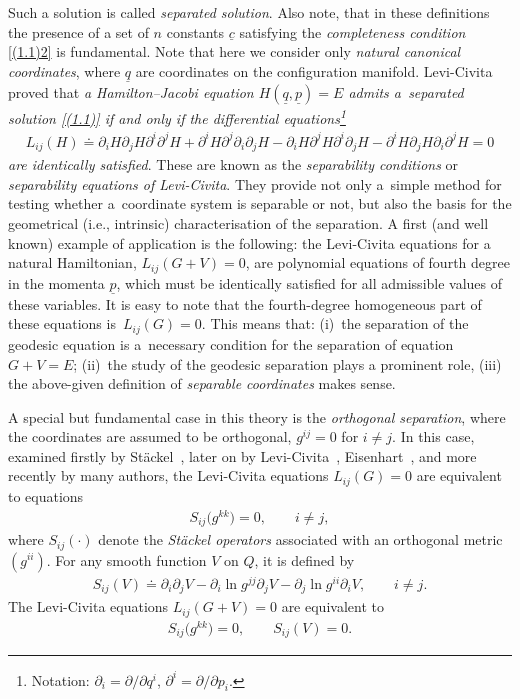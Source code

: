 \documentclass[pdftex]{sigma}
\numberwithin{equation}{section}
\begin{document}
Such a solution is called {\it separated solution}. Also note, that in these def\/initions the presence of a set of $n$ constants $\underline c$ satisfying the {\it completeness condition} \eqref{(1.1)2} is fundamental. Note that here we consider only {\it natural canonical coordinates}, where $\underline q$ are coordinates on the conf\/iguration manifold. Levi-Civita~\cite{LC-1904} proved that {\it a Hamilton--Jacobi equation $H(\underline q,\underline p)=E$ admits a~separated solution \eqref{(1.1)} if and only if the differential equations\footnote{Notation: $\partial_i=\partial/\partial q^i$, $\partial^i=\partial/\partial p_i$.}
\begin{gather*}
L_{ij}(H)\doteq \partial _i H\partial_jH \partial ^i\partial^jH+
\partial^iH \partial ^j \partial _i\partial_jH-
\partial_iH \partial ^jH \partial ^i\partial _jH-
\partial^iH \partial _jH \partial _i\partial ^jH=0
\end{gather*}
are identically satisfied}. These are known as the {\it separability conditions} or {\it separability equations of Levi-Civita}. They provide not only a~simple method for testing whether a~coordinate system is separable or not, but also the basis for the geometrical (i.e., intrinsic) characterisation of the separation. A f\/irst (and well known) example of application is the following: the Levi-Civita equations for a natural Hamiltonian, $L_{ij}(G+V)=0$, are polynomial equations of fourth degree in the momenta $\underline p$, which must be identically satisf\/ied for all admissible values of these variables. It is easy to note that the fourth-degree homogeneous part of these equations is~$L_{ij}(G)=0$. This means that: (i)~the separation of the geodesic equation is a~necessary condition for the separation of equation $G+V=E$; (ii)~the study of the geodesic separation plays a prominent role, (iii) the above-given def\/inition of {\it separable coordinates} makes sense.

A special but fundamental case in this theory is the {\it orthogonal separation}, where the coordinates are assumed to be orthogonal, $g^{ij}=0$ for $i\neq j$. In this case, examined f\/irstly by St\"ackel~\cite{Stackel-1893,Stackel-1897}, later on by Levi-Civita~\cite{LC-1904}, Eisenhart~\cite{Eisenhart-1934,Eisenhart-1949}, and more recently by many authors, the Levi-Civita equations $L_{ij}(G)=0$ are equivalent to equations
\begin{gather}\label{(1.2)}
S_{ij}\big(g^{kk}\big)=0, \qquad i\neq j,
\end{gather}
where $S_{ij}(\cdot)$ denote the {\it St\"ackel operators} associated with an orthogonal metric $(g^{ii})$.
For any smooth function $V$ on $Q$, it is def\/ined by
\begin{gather*}
S_{ij}(V)\doteq \partial_i\partial_j V-\partial_i\ln g^{jj}\partial_j V-\partial_j\ln g^{ii}\partial_i V,  \qquad i\neq j.
\end{gather*}
The Levi-Civita equations $L_{ij}(G+V)=0$ are equivalent to
\begin{gather}
S_{ij}\big(g^{kk}\big)=0, \qquad S_{ij}(V)=0.
\label{(1.3)}
\end{gather}
\end{document}
